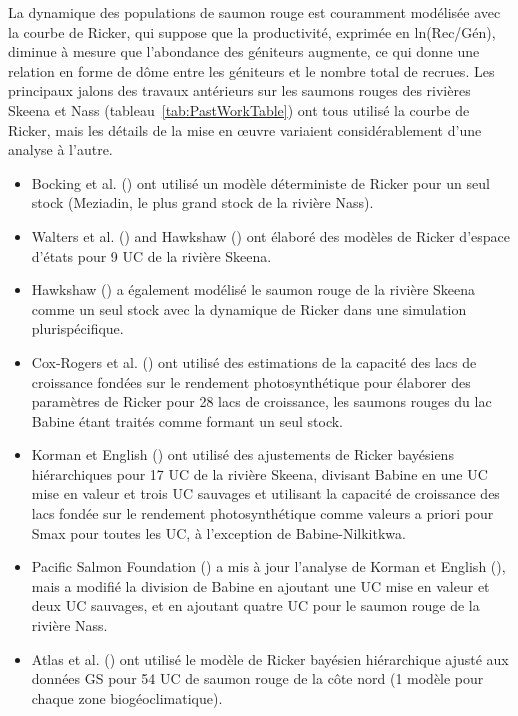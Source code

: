 \documentclass[french,11pt]{book}
\begin{document}
La dynamique des populations de saumon rouge est couramment modélisée avec la courbe de Ricker, qui suppose que la productivité, exprimée en ln(Rec/Gén), diminue à mesure que l'abondance des géniteurs augmente, ce qui donne une relation en forme de dôme entre les géniteurs et le nombre total de recrues. Les principaux jalons des travaux antérieurs sur les saumons rouges des rivières Skeena et Nass (tableau~\ref{tab:PastWorkTable}) ont tous utilisé la courbe de Ricker, mais les détails de la mise en œuvre variaient considérablement d'une analyse à l'autre.
\begin{itemize}

\item
  Bocking et al. () ont utilisé un modèle déterministe de Ricker pour un seul stock (Meziadin, le plus grand stock de la rivière Nass).
\item
  Walters et al. () and Hawkshaw () ont élaboré des modèles de Ricker d'espace d'états pour 9 UC de la rivière Skeena.
\item
  Hawkshaw () a également modélisé le saumon rouge de la rivière Skeena comme un seul stock avec la dynamique de Ricker dans une simulation plurispécifique.
\item
  Cox-Rogers et al. () ont utilisé des estimations de la capacité des lacs de croissance fondées sur le rendement photosynthétique pour élaborer des paramètres de Ricker pour 28 lacs de croissance, les saumons rouges du lac Babine étant traités comme formant un seul stock.
\item
  Korman et English () ont utilisé des ajustements de Ricker bayésiens hiérarchiques pour 17 UC de la rivière Skeena, divisant Babine en une UC mise en valeur et trois UC sauvages et utilisant la capacité de croissance des lacs fondée sur le rendement photosynthétique comme valeurs a priori pour Smax pour toutes les UC, à l'exception de Babine-Nilkitkwa.
\item
  Pacific Salmon Foundation () a mis à jour l'analyse de Korman et English (), mais a modifié la division de Babine en ajoutant une UC mise en valeur et deux UC sauvages, et en ajoutant quatre UC pour le saumon rouge de la rivière Nass.
\item
  Atlas et al. () ont utilisé le modèle de Ricker bayésien hiérarchique ajusté aux données GS pour 54 UC de saumon rouge de la côte nord (1 modèle pour chaque zone biogéoclimatique).
\end{itemize}
\end{document}
